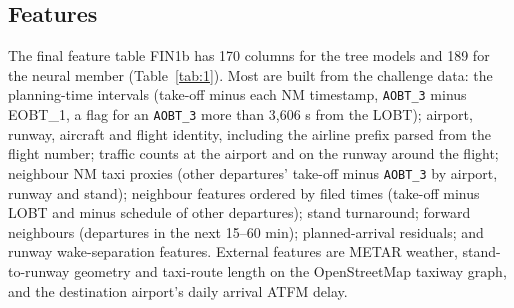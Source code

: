\documentclass[11pt,a4paper]{article}
\begin{document}
\subsection{Features}\label{features}

The final feature table FIN1b has 170 columns for the tree models and 189 for the neural member (Table~\ref{tab:1}). Most are built from the challenge data: the planning-time intervals (take-off minus each NM timestamp, \texttt{AOBT\_\allowbreak{}3} minus EOBT\_1, a flag for an \texttt{AOBT\_\allowbreak{}3} more than 3,606 s from the LOBT); airport, runway, aircraft and flight identity, including the airline prefix parsed from the flight number; traffic counts at the airport and on the runway around the flight; neighbour NM taxi proxies (other departures' take-off minus \texttt{AOBT\_\allowbreak{}3} by airport, runway and stand); neighbour features ordered by filed times (take-off minus LOBT and minus schedule of other departures); stand turnaround; forward neighbours (departures in the next 15--60 min); planned-arrival residuals; and runway wake-separation features. External features are METAR weather, stand-to-runway geometry and taxi-route length on the OpenStreetMap taxiway graph, and the destination airport's daily arrival ATFM delay.
\end{document}
